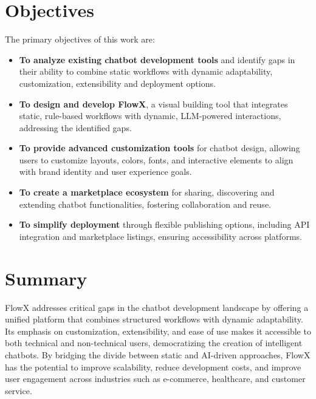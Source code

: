 \section{Objectives}
The primary objectives of this work are:
\begin{itemize}
    \item \textbf{To analyze existing chatbot development tools} and identify gaps in their ability to combine static workflows with dynamic adaptability, customization, extensibility and deployment options.
    
    \item \textbf{To design and develop FlowX}, a visual building tool that integrates static, rule-based workflows with dynamic, LLM-powered interactions, addressing the identified gaps.
    
    \item \textbf{To provide advanced customization tools} for chatbot design, allowing users to customize layouts, colors, fonts, and interactive elements to align with brand identity and user experience goals.
    
    \item \textbf{To create a marketplace ecosystem} for sharing, discovering and extending chatbot functionalities, fostering collaboration and reuse.
    
    \item \textbf{To simplify deployment} through flexible publishing options, including API integration and marketplace listings, ensuring accessibility across platforms.
\end{itemize}

\section{Summary}
FlowX addresses critical gaps in the chatbot development landscape by offering a unified platform that combines structured workflows with dynamic adaptability. Its emphasis on customization, extensibility, and ease of use makes it accessible to both technical and non-technical users, democratizing the creation of intelligent chatbots. By bridging the divide between static and AI-driven approaches, FlowX has the potential to improve scalability, reduce development costs, and improve user engagement across industries such as e-commerce, healthcare, and customer service.
